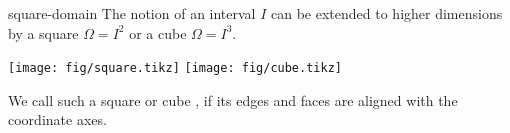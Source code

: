 \begin{Example}{square-domain}
  The notion of an interval $I$ can be extended to higher dimensions
  by a square $\Omega = I^2$ or a cube $\Omega = I^3$.
  \begin{center}
    \texttt{[image: fig/square.tikz]}
    \hfill
    \texttt{[image: fig/cube.tikz]}
  \end{center}
  We call such a square or cube , if its edges and
  faces are aligned with the coordinate axes.
\end{Example}

